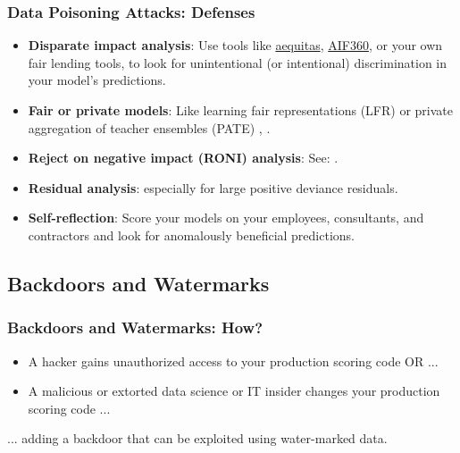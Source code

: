\documentclass[11pt,
               aspectratio=169,
               hyperref={colorlinks}
               ]{beamer}
\begin{document}
			\begin{frame}[label={slide:data_poisoning_defense}]
		
				\frametitle{Data Poisoning Attacks: \textbf{Defenses}}
				
				\begin{itemize}
					\item \textbf{Disparate impact analysis}: Use tools like \href{https://github.com/dssg/aequitas}{aequitas}, \href{https://github.com/IBM/AIF360}{AIF360}, or your own fair lending tools, to look for unintentional (or intentional) discrimination in your model’s predictions. 
					\item \textbf{Fair or private models}: Like learning fair representations (LFR) or private aggregation of teacher ensembles (PATE) \cite{pate}, \cite{lfr}.
					\item \textbf{Reject on negative impact (RONI) analysis}: See: \textit{}. 		
					\item \textbf{Residual analysis}: especially for large positive deviance residuals.
					\item \textbf{Self-reflection}: Score your models on your employees, consultants, and contractors and look for anomalously beneficial predictions.
				\end{itemize}	
			\end{frame}
		
		\subsection{Backdoors and Watermarks}
			
			\begin{frame}
		
				\frametitle{Backdoors and Watermarks: \textbf{How?}}
				\begin{itemize}
				\item A hacker gains unauthorized access to your production scoring code OR ... 
				\item A malicious or extorted data science or IT insider changes your production scoring code ... 
				\end{itemize}
				\vspace{20pt}
\hspace{10pt} ... adding a backdoor that can be exploited using water-marked data.
			
			\end{frame}
		
\end{document}
